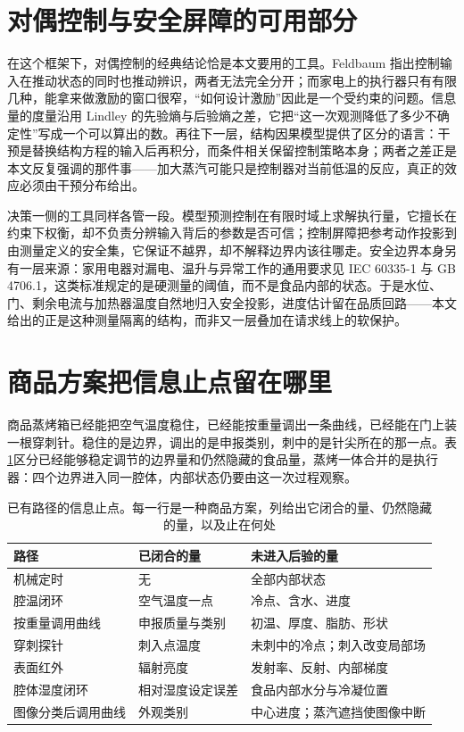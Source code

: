 \section{对偶控制与安全屏障的可用部分}

在这个框架下，对偶控制的经典结论恰是本文要用的工具。Feldbaum 指出控制输入在推动状态的同时也推动辨识，两者无法完全分开\cite{feldbaum1965}；而家电上的执行器只有有限几种，能拿来做激励的窗口很窄，“如何设计激励”因此是一个受约束的问题。信息量的度量沿用 Lindley 的先验熵与后验熵之差\cite{lindley1956}，它把“这一次观测降低了多少不确定性”写成一个可以算出的数。再往下一层，结构因果模型提供了区分的语言：干预是替换结构方程的输入后再积分，而条件相关保留控制策略本身\cite{pearl2009}；两者之差正是本文反复强调的那件事——加大蒸汽可能只是控制器对当前低温的反应，真正的效应必须由干预分布给出。

决策一侧的工具同样各管一段。模型预测控制在有限时域上求解执行量\cite{rawlings2017}，它擅长在约束下权衡，却不负责分辨输入背后的参数是否可信；控制屏障把参考动作投影到由测量定义的安全集\cite{ames2017cbf}，它保证不越界，却不解释边界内该往哪走。安全边界本身另有一层来源：家用电器对漏电、温升与异常工作的通用要求见 IEC 60335-1 与 GB 4706.1\cite{iec60335,gb4706}，这类标准规定的是硬测量的阈值，而不是食品内部的状态。于是水位、门、剩余电流与加热器温度自然地归入安全投影，进度估计留在品质回路——本文给出的正是这种测量隔离的结构，而非又一层叠加在请求线上的软保护。

\section{商品方案把信息止点留在哪里}

商品蒸烤箱已经能把空气温度稳住，已经能按重量调出一条曲线，已经能在门上装一根穿刺针。稳住的是边界，调出的是申报类别，刺中的是针尖所在的那一点。表\ref{tab:stop}{}区分已经能够稳定调节的边界量和仍然隐藏的食品量，蒸烤一体合并的是执行器：四个边界进入同一腔体，内部状态仍要由这一次过程观察。

\begin{table}[t]
\centering
\caption{已有路径的信息止点。每一行是一种商品方案，列给出它闭合的量、仍然隐藏的量，以及止在何处}
\label{tab:stop}
\begin{tabularx}{\textwidth}{l>{\raggedright\arraybackslash}p{4.2cm}>{\raggedright\arraybackslash}p{4.6cm}}
\toprule
路径 & 已闭合的量 & 未进入后验的量 \\
\midrule
机械定时 & 无 & 全部内部状态 \\
腔温闭环 & 空气温度一点 & 冷点、含水、进度 \\
按重量调用曲线 & 申报质量与类别 & 初温、厚度、脂肪、形状 \\
穿刺探针 & 刺入点温度 & 未刺中的冷点；刺入改变局部场 \\
表面红外 & 辐射亮度 & 发射率、反射、内部梯度 \\
腔体湿度闭环 & 相对湿度设定误差 & 食品内部水分与冷凝位置 \\
图像分类后调用曲线 & 外观类别 & 中心进度；蒸汽遮挡使图像中断 \\
\bottomrule
\end{tabularx}
\end{table}

